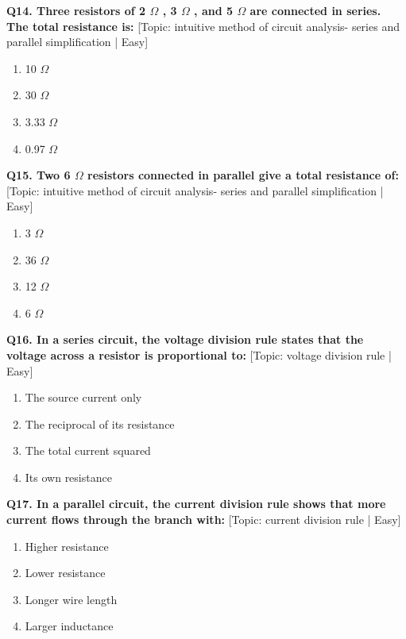 \noindent\textbf{Q14. Three resistors of 2 $\Omega$ , 3 $\Omega$ , and 5 $\Omega$ are connected in series. The total resistance is:} \hfill [Topic: intuitive method of circuit analysis- series and parallel simplification | Easy]
\begin{enumerate}[label=(\alph*),topsep=2pt,itemsep=1pt,partopsep=0pt,parsep=0pt]
    \item {10 $\Omega$}
    \item {30 $\Omega$}
    \item {3.33 $\Omega$}
    \item {0.97 $\Omega$}
\end{enumerate}
\vspace{2mm}

\noindent\textbf{Q15. Two 6 $\Omega$ resistors connected in parallel give a total resistance of:} \hfill [Topic: intuitive method of circuit analysis- series and parallel simplification | Easy]
\begin{enumerate}[label=(\alph*),topsep=2pt,itemsep=1pt,partopsep=0pt,parsep=0pt]
    \item {3 $\Omega$}
    \item {36 $\Omega$}
    \item {12 $\Omega$}
    \item {6 $\Omega$}
\end{enumerate}
\vspace{2mm}

\noindent\textbf{Q16. In a series circuit, the voltage division rule states that the voltage across a resistor is proportional to:} \hfill [Topic: voltage division rule | Easy]
\begin{enumerate}[label=(\alph*),topsep=2pt,itemsep=1pt,partopsep=0pt,parsep=0pt]
    \item {The source current only}
    \item {The reciprocal of its resistance}
    \item {The total current squared}
    \item {Its own resistance}
\end{enumerate}
\vspace{2mm}

\noindent\textbf{Q17. In a parallel circuit, the current division rule shows that more current flows through the branch with:} \hfill [Topic: current division rule | Easy]
\begin{enumerate}[label=(\alph*),topsep=2pt,itemsep=1pt,partopsep=0pt,parsep=0pt]
    \item {Higher resistance}
    \item {Lower resistance}
    \item {Longer wire length}
    \item {Larger inductance}
\end{enumerate}
\vspace{2mm}

